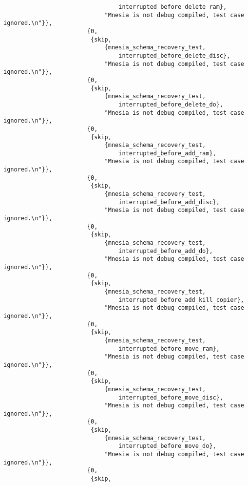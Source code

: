 \begin{verbatim}
                                 interrupted_before_delete_ram},
                             "Mnesia is not debug compiled, test case ignored.\n"}},
                        {0,
                         {skip,
                             {mnesia_schema_recovery_test,
                                 interrupted_before_delete_disc},
                             "Mnesia is not debug compiled, test case ignored.\n"}},
                        {0,
                         {skip,
                             {mnesia_schema_recovery_test,
                                 interrupted_before_delete_do},
                             "Mnesia is not debug compiled, test case ignored.\n"}},
                        {0,
                         {skip,
                             {mnesia_schema_recovery_test,
                                 interrupted_before_add_ram},
                             "Mnesia is not debug compiled, test case ignored.\n"}},
                        {0,
                         {skip,
                             {mnesia_schema_recovery_test,
                                 interrupted_before_add_disc},
                             "Mnesia is not debug compiled, test case ignored.\n"}},
                        {0,
                         {skip,
                             {mnesia_schema_recovery_test,
                                 interrupted_before_add_do},
                             "Mnesia is not debug compiled, test case ignored.\n"}},
                        {0,
                         {skip,
                             {mnesia_schema_recovery_test,
                                 interrupted_before_add_kill_copier},
                             "Mnesia is not debug compiled, test case ignored.\n"}},
                        {0,
                         {skip,
                             {mnesia_schema_recovery_test,
                                 interrupted_before_move_ram},
                             "Mnesia is not debug compiled, test case ignored.\n"}},
                        {0,
                         {skip,
                             {mnesia_schema_recovery_test,
                                 interrupted_before_move_disc},
                             "Mnesia is not debug compiled, test case ignored.\n"}},
                        {0,
                         {skip,
                             {mnesia_schema_recovery_test,
                                 interrupted_before_move_do},
                             "Mnesia is not debug compiled, test case ignored.\n"}},
                        {0,
                         {skip,

\end{verbatim}
